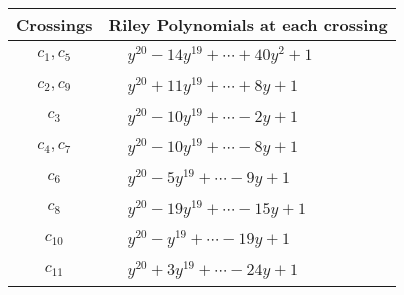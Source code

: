 \documentclass[1p]{elsarticle_modified}
\theoremstyle{definition}
\begin{document}
\begin{tabular}{m{50pt}|m{274pt}}
Crossings & \hspace{64pt}Riley Polynomials at each crossing \\
\hline $$\begin{aligned}c_{1},c_{5}\end{aligned}$$&$\begin{aligned}
&y^{20}-14 y^{19}+\cdots+40 y^2+1
\end{aligned}$\\
\hline $$\begin{aligned}c_{2},c_{9}\end{aligned}$$&$\begin{aligned}
&y^{20}+11 y^{19}+\cdots+8 y+1
\end{aligned}$\\
\hline $$\begin{aligned}c_{3}\end{aligned}$$&$\begin{aligned}
&y^{20}-10 y^{19}+\cdots-2 y+1
\end{aligned}$\\
\hline $$\begin{aligned}c_{4},c_{7}\end{aligned}$$&$\begin{aligned}
&y^{20}-10 y^{19}+\cdots-8 y+1
\end{aligned}$\\
\hline $$\begin{aligned}c_{6}\end{aligned}$$&$\begin{aligned}
&y^{20}-5 y^{19}+\cdots-9 y+1
\end{aligned}$\\
\hline $$\begin{aligned}c_{8}\end{aligned}$$&$\begin{aligned}
&y^{20}-19 y^{19}+\cdots-15 y+1
\end{aligned}$\\
\hline $$\begin{aligned}c_{10}\end{aligned}$$&$\begin{aligned}
&y^{20}- y^{19}+\cdots-19 y+1
\end{aligned}$\\
\hline $$\begin{aligned}c_{11}\end{aligned}$$&$\begin{aligned}
&y^{20}+3 y^{19}+\cdots-24 y+1
\end{aligned}$\\
\hline
\end{tabular}\\~\\
\end{document}
